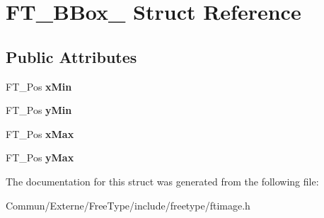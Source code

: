 \hypertarget{struct_f_t___b_box__}{}\section{F\+T\+\_\+\+B\+Box\+\_\+ Struct Reference}
\label{struct_f_t___b_box__}
\subsection*{Public Attributes}
\begin{DoxyCompactItemize}
\item 
F\+T\+\_\+\+Pos {\bfseries x\+Min}\hypertarget{struct_f_t___b_box___a1f2a5d0565d496c1d41e43d018f45add}{}\label{struct_f_t___b_box___a1f2a5d0565d496c1d41e43d018f45add}

\item 
F\+T\+\_\+\+Pos {\bfseries y\+Min}\hypertarget{struct_f_t___b_box___a959ca1d5bc1c5338da0d85c8e7135f4e}{}\label{struct_f_t___b_box___a959ca1d5bc1c5338da0d85c8e7135f4e}

\item 
F\+T\+\_\+\+Pos {\bfseries x\+Max}\hypertarget{struct_f_t___b_box___ac6da5c44f4cb7b97eef1f438eb69c0ec}{}\label{struct_f_t___b_box___ac6da5c44f4cb7b97eef1f438eb69c0ec}

\item 
F\+T\+\_\+\+Pos {\bfseries y\+Max}\hypertarget{struct_f_t___b_box___a77084921589f386a8a593ae1f25b1569}{}\label{struct_f_t___b_box___a77084921589f386a8a593ae1f25b1569}

\end{DoxyCompactItemize}


The documentation for this struct was generated from the following file\+:\begin{DoxyCompactItemize}
\item 
Commun/\+Externe/\+Free\+Type/include/freetype/ftimage.\+h\end{DoxyCompactItemize}

